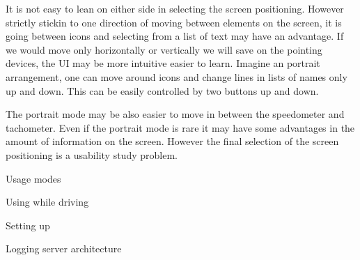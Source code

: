 It is not easy to lean on either side in selecting the screen positioning. However strictly stickin to one direction of moving between elements on the screen, it is going between icons and selecting from a list of text may have an advantage. If we would move only horizontally or vertically we will save on the pointing devices, the UI may be more intuitive easier to learn. Imagine an portrait arrangement, one can move around icons and change lines in lists of names only up and down. This can be easily controlled by two buttons up and down. 

The portrait mode may be also easier to move in between the speedometer and tachometer. Even if the portrait mode is rare it may have some advantages in the amount of information on the screen. However the final selection of the screen positioning is a usability study problem. 

\secc Usage modes 


\seccc Using while driving

\seccc Setting up




\sec Logging server architecture


